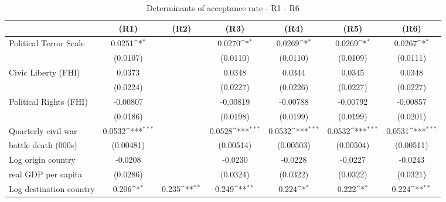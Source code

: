 \begin{table}[!ht]\centering \scriptsize
\def\sym#1{\ifmmode^{#1}\else\(^{#1}\)\fi}
\caption{Determinants of acceptance rate - R1 - R6}
\begin{tabular}{l*{6}{c}}
\hline\hline
                    &\multicolumn{1}{c}{(R1)}&\multicolumn{1}{c}{(R2)}&\multicolumn{1}{c}{(R3)}&\multicolumn{1}{c}{(R4)}&\multicolumn{1}{c}{(R5)}&\multicolumn{1}{c}{(R6)}\\
\hline
Political Terror Scale&      0.0251\sym{*}  &                     &      0.0270\sym{*}  &      0.0269\sym{*}  &      0.0269\sym{*}  &      0.0267\sym{*}  \\
                    &    (0.0107)         &                     &    (0.0110)         &    (0.0110)         &    (0.0109)         &    (0.0111)         \\
[0.5em]
Civic Liberty (FHI) &      0.0373         &                     &      0.0348         &      0.0344         &      0.0345         &      0.0348         \\
                    &    (0.0224)         &                     &    (0.0227)         &    (0.0226)         &    (0.0227)         &    (0.0227)         \\
[0.5em]
Political Rights (FHI)&    -0.00807         &                     &    -0.00819         &    -0.00788         &    -0.00792         &    -0.00857         \\
                    &    (0.0186)         &                     &    (0.0198)         &    (0.0199)         &    (0.0199)         &    (0.0201)         \\
[0.5em]
Quarterly civil war &      0.0532\sym{***}&                     &      0.0528\sym{***}&      0.0532\sym{***}&      0.0532\sym{***}&      0.0531\sym{***}\\
battle death (000s)                    &   (0.00481)         &                     &   (0.00514)         &   (0.00503)         &   (0.00504)         &   (0.00511)         \\
[0.5em]
Log origin country &     -0.0208         &                     &     -0.0230         &     -0.0228         &     -0.0227         &     -0.0243         \\
real GDP per capita                    &    (0.0286)         &                     &    (0.0324)         &    (0.0322)         &    (0.0322)         &    (0.0321)         \\
[0.5em]
Log destination country &       0.206\sym{*}  &       0.235\sym{**} &       0.249\sym{**} &       0.224\sym{*}  &       0.222\sym{*}  &       0.224\sym{**} \\

\end{tabular}
\end{table}
